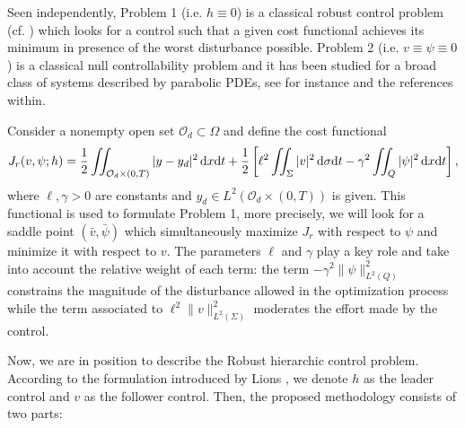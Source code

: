 \documentclass{dcds-bOF}
\theoremstyle{definition}
\def\dx{\,\textnormal{d}x}
\def\dt{\textnormal{d}t}
\def\d{\,\textnormal{d}}
\begin{document}
Seen independently, Problem 1 (i.e. $h\equiv 0$) is a classical robust control problem (cf. \cite{temam,temam_nonlinear,aziz}) which looks for a control such that a given cost functional achieves its minimum in presence of the worst disturbance possible. Problem 2 (i.e. $v\equiv\psi\equiv 0$) is a classical null controllability problem and it has been studied for a broad class of systems described by parabolic PDEs, see for instance \cite{cara_guerrero} and the references within.

Consider a nonempty open set $\mathcal O_d\subset \Omega$ and define the cost functional
%
\begin{equation}\label{func_rob}
J_r(v,\psi;h)=\frac{1}{2}\iint_{\mathcal O_d\times(0,T)}|y-y_d|^2\dx\dt+\frac{1}{2}\left[\ell^2\iint_{\Sigma}|v|^2\d\sigma\dt-\gamma^2\iint_Q|\psi|^2\dx\dt\right],
\end{equation}
%
%
where $\ell,\gamma>0$ are constants and $y_d\in L^2(\mathcal O_d\times(0,T))$ is given. This functional is used to formulate  Problem 1, more precisely, we will look for a saddle point $(\bar v,\bar \psi)$ which simultaneously maximize $J_r$ with respect to $\psi$ and minimize it with respect to $v$. The parameters $\ell$ and $\gamma$ play a key role and take into account the relative weight of each term: the term $-\gamma^2\|\psi\|^2_{L^2(Q)}$ constrains the magnitude of the disturbance allowed in the optimization process while the term associated to $\ell^2\|v\|^2_{L^2(\Sigma)}$ moderates the effort made by the control.

Now, we are in position to describe the Robust hierarchic control problem. According to the formulation introduced by Lions \cite{LionsSta}, we denote $h$ as the leader control and $v$ as the follower control. Then, the proposed methodology consists of two parts:
\end{document}
